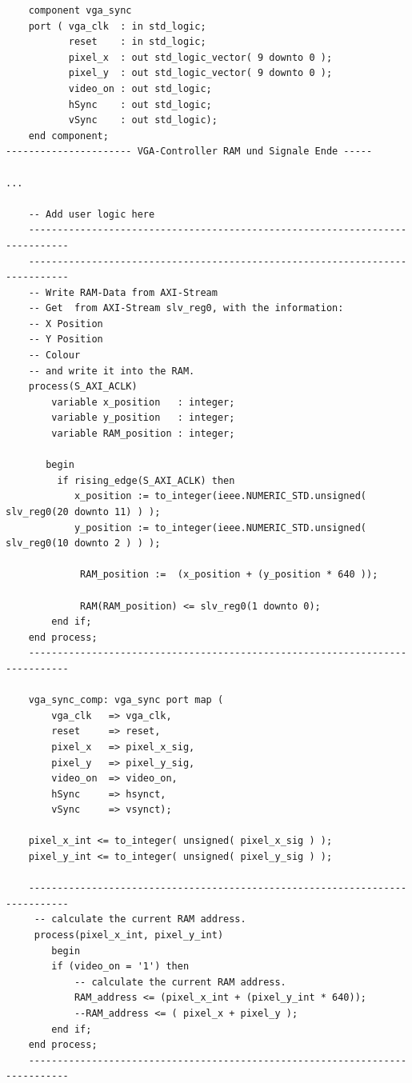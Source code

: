 \begin{verbatim}
    component vga_sync
    port ( vga_clk  : in std_logic;
           reset    : in std_logic;
           pixel_x  : out std_logic_vector( 9 downto 0 );
           pixel_y  : out std_logic_vector( 9 downto 0 );
           video_on : out std_logic;
           hSync    : out std_logic;
           vSync    : out std_logic);
    end component;  
---------------------- VGA-Controller RAM und Signale Ende -----

...

	-- Add user logic here
    -----------------------------------------------------------------------------
    -----------------------------------------------------------------------------    
    -- Write RAM-Data from AXI-Stream
    -- Get  from AXI-Stream slv_reg0, with the information:
    -- X Position
    -- Y Position
    -- Colour
    -- and write it into the RAM.
    process(S_AXI_ACLK)
        variable x_position   : integer;
        variable y_position   : integer;
        variable RAM_position : integer;
        
       begin
         if rising_edge(S_AXI_ACLK) then    
            x_position := to_integer(ieee.NUMERIC_STD.unsigned( slv_reg0(20 downto 11) ) );
            y_position := to_integer(ieee.NUMERIC_STD.unsigned( slv_reg0(10 downto 2 ) ) );
                          
             RAM_position :=  (x_position + (y_position * 640 ));
                           
             RAM(RAM_position) <= slv_reg0(1 downto 0);                             
        end if;
    end process;    
    ----------------------------------------------------------------------------- 
    
    vga_sync_comp: vga_sync port map (
        vga_clk   => vga_clk,
        reset     => reset,
        pixel_x   => pixel_x_sig,
        pixel_y   => pixel_y_sig,
        video_on  => video_on,
        hSync     => hsynct,
        vSync     => vsynct);
    
    pixel_x_int <= to_integer( unsigned( pixel_x_sig ) );
    pixel_y_int <= to_integer( unsigned( pixel_y_sig ) );
    
    -----------------------------------------------------------------------------
     -- calculate the current RAM address.
     process(pixel_x_int, pixel_y_int)
        begin
        if (video_on = '1') then
            -- calculate the current RAM address.
            RAM_address <= (pixel_x_int + (pixel_y_int * 640));
            --RAM_address <= ( pixel_x + pixel_y );
        end if;
    end process;
    -----------------------------------------------------------------------------
    

\end{verbatim}
